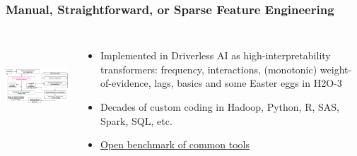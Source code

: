 \documentclass[11pt,
               aspectratio=169,
               hyperref={colorlinks}
               ]{beamer}
\begin{document}
		\begin{frame}
		
			\frametitle{Manual, Straightforward, or Sparse Feature Engineering}		
		
			\begin{columns}
	
				\centering
				\includegraphics[height=100pt]{img/fe.png}
				
				\vspace{-5pt}
				\begin{itemize}
					\item Implemented in Driverless AI as high-interpretability transformers: frequency, interactions, (monotonic) weight-of-evidence, lags, basics and some Easter eggs in H2O-3
					\item Decades of custom coding in Hadoop, Python, R, SAS, Spark, SQL, etc.
					\item \href{https://github.com/szilard/benchm-databases}{Open benchmark of common tools}
				\end{itemize}
				
			\end{columns}		
		
		\end{frame}
	
\end{document}
